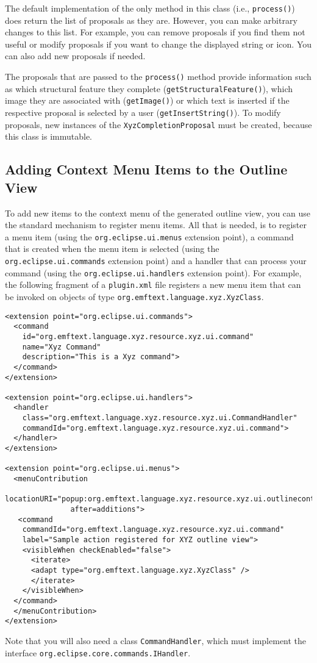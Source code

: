 The default implementation of the only method in this class (i.e.,
\texttt{process()}) does return the list of proposals as they are. However, you
can make arbitrary changes to this list. For example, you can remove proposals
if you find them not useful or modify proposals if you want to change the
displayed string or icon. You can also add new proposals if needed.

The proposals that are passed to the \texttt{process()} method provide 
information such as which structural feature they complete
(\texttt{getStructuralFeature()}), which image they are associated with
(\texttt{getImage()}) or which text is inserted if the respective proposal is
selected by a user (\texttt{getInsertString()}). To modify proposals, new
instances of the \texttt{XyzCompletionProposal} must be created, because this 
class is immutable.

\subsection{Adding Context Menu Items to the Outline View}

To add new items to the context menu of the generated outline view, you can use
the standard mechanism to register menu items. All that is needed, is to
register a menu item (using the \texttt{org.eclipse.ui.menus} extension point),
a command that is created when the menu item is selected (using the
\texttt{org.eclipse.ui.commands} extension point) and a handler that can process
your command (using the \texttt{org.eclipse.ui.handlers} extension point). For
example, the following fragment of a \texttt{plugin.xml} file registers a new
menu item that can be invoked on objects of type
\texttt{org.emftext.language.xyz.XyzClass}.

\begin{lstlisting}
<extension point="org.eclipse.ui.commands">
  <command
    id="org.emftext.language.xyz.resource.xyz.ui.command"
    name="Xyz Command"
    description="This is a Xyz command">
  </command>
</extension>

<extension point="org.eclipse.ui.handlers">
  <handler
    class="org.emftext.language.xyz.resource.xyz.ui.CommandHandler"
    commandId="org.emftext.language.xyz.resource.xyz.ui.command">
  </handler>
</extension>

<extension point="org.eclipse.ui.menus">
  <menuContribution 
  locationURI="popup:org.emftext.language.xyz.resource.xyz.ui.outlinecontext?
               after=additions">
   <command
    commandId="org.emftext.language.xyz.resource.xyz.ui.command"
    label="Sample action registered for XYZ outline view">
    <visibleWhen checkEnabled="false">
      <iterate>
      <adapt type="org.emftext.language.xyz.XyzClass" />
      </iterate>
    </visibleWhen>
  </command>
  </menuContribution>
</extension>
\end{lstlisting}

Note that you will also need a class \texttt{CommandHandler}, which must
implement the interface \texttt{org.eclipse.core.commands.IHandler}.
